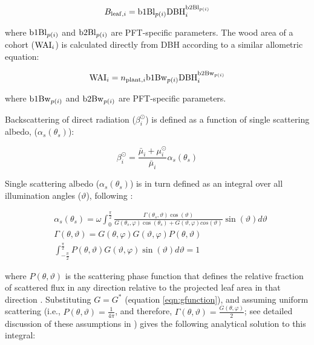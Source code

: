 \begin{equation}
  B_{\mathrm{leaf}, i} = \mathrm{b1Bl}_{p(i)} \mathrm{DBH}_{i}^{\mathrm{b2Bl}_{p(i)}}
\end{equation}

where $\mathrm{b1Bl}_{p(i)}$ and $\mathrm{b2Bl}_{p(i)}$ are PFT-specific parameters.
The wood area of a cohort ($\mathrm{WAI}_{i}$) is calculated directly from DBH according to a similar allometric equation:

\begin{equation}
  \mathrm{WAI}_{i} = n_{\mathrm{plant}, i} \mathrm{b1Bw}_{p(i)} \mathrm{DBH}_{i}^{\mathrm{b2Bw}_{p(i)}}
\end{equation}

where $\mathrm{b1Bw}_{p(i)}$ and $\mathrm{b2Bw}_{p(i)}$ are PFT-specific parameters.

Backscattering of direct radiation ($\beta^{\odot}_{i}$) is defined as a function of single scattering albedo, ($\alpha_{s}(\theta_{s})$):

\begin{equation}
  \beta^{\odot}_{i} = \frac{\bar{\mu}_{i} + \mu^{\odot}_{i}}{\bar{\mu}_{i}} \alpha_{s}(\theta_{s})
\end{equation}

Single scattering albedo ($\alpha_{s}(\theta_{s})$) is in turn defined as an integral over all illumination angles ($\vartheta$), following \citet{sellers1985canopy} :

\begin{align}
  & \alpha_{s}(\theta_{s}) = \omega \int_{0}^{\frac{\pi}{2}} \frac{\Gamma(\theta_{s}, \vartheta) \cos(\vartheta)} {G(\theta_{s}, \varphi) \cos(\theta_{s}) + G(\vartheta, \varphi) cos(\vartheta)} \sin(\vartheta) d \vartheta \\
  & \Gamma(\theta, \vartheta) = G(\theta, \varphi) G(\vartheta, \varphi) P(\theta, \vartheta) \\
  & \int_{-\frac{\pi}{2}}^{\frac{\pi}{2}} P(\theta, \vartheta) G(\vartheta, \varphi) \sin(\vartheta) d\vartheta = 1
\end{align}

where $P(\theta, \vartheta)$ is the scattering phase function that defines the relative fraction of scattered flux in any direction relative to the projected leaf area in that direction \citep{dickinson1983land}.
Substituting $G = G^{*}$ (equation \ref{eqn:gfunction}),
and assuming uniform scattering (i.e., $P(\theta, \vartheta) = \frac{1}{4\pi}$, and therefore, $\Gamma(\theta, \vartheta) = \frac{G(\theta, \varphi)}{2}$; see detailed discussion of these assumptions in \citealt{yuan2017reexamination})
gives the following analytical solution to this integral:

